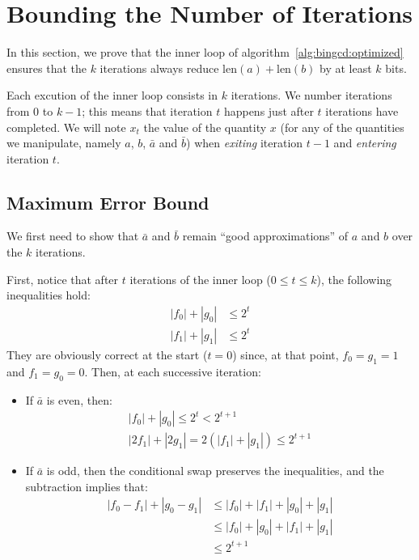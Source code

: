 \documentclass{llncs}
\newcommand{\bitlength}{\text{len}}
\begin{document}
\appendix

\newpage
\section{Bounding the Number of Iterations}\label{sec:iterbound}

In this section, we prove that the inner loop of
algorithm~\ref{alg:bingcd:optimized} ensures that the $k$ iterations
always reduce $\bitlength(a)+\bitlength(b)$ by at least $k$ bits.

Each excution of the inner loop consists in $k$ iterations. We number
iterations from $0$ to $k-1$; this means that iteration $t$ happens just
after $t$ iterations have completed. We will note $x_t$ the value of the
quantity $x$ (for any of the quantities we manipulate, namely $a$, $b$,
$\bar a$ and $\bar b$) when \emph{exiting} iteration $t-1$ and
\emph{entering} iteration $t$.

\subsection{Maximum Error Bound}\label{sec:iterbound:error}

We first need to show that $\bar a$ and $\bar b$ remain ``good
approximations'' of $a$ and $b$ over the $k$ iterations.

First, notice that after $t$ iterations of the inner loop
($0\leq t\leq k$), the following inequalities hold:
\begin{align*}
    |f_0| + |g_0| &\leq 2^t \\
    |f_1| + |g_1| &\leq 2^t
\end{align*}
They are obviously correct at the start ($t = 0$) since, at that point,
$f_0 = g_1 = 1$ and $f_1 = g_0 = 0$. Then, at each successive iteration:
\begin{itemize}

    \item If $\bar a$ is even, then:
    \begin{equation*}
        \begin{gathered}
            |f_0| + |g_0| \leq 2^t < 2^{t+1} \\
            |2f_1| + |2g_1| = 2(|f_1| + |g_1|) \leq 2^{t+1}
        \end{gathered}
    \end{equation*}

    \item If $\bar a$ is odd, then the conditional swap preserves the
    inequalities, and the subtraction implies that:
    \begin{align*}
        |f_0 - f_1| + |g_0 - g_1| &\leq |f_0| + |f_1| + |g_0| + |g_1| \\
                                  &\leq |f_0| + |g_0| + |f_1| + |g_1| \\
                                  &\leq 2^{t+1}
    \end{align*}

\end{itemize}
\end{document}
